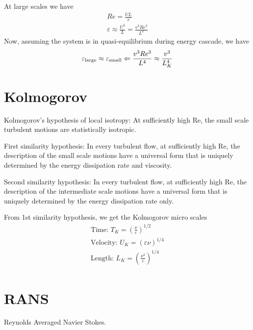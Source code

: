 \documentclass{article}
\let\epsilon\varepsilon
\begin{document}
At large scales we have 
\begin{equation}
	\begin{split}
	Re = \frac{UL}{v}\\
	\epsilon \approx \frac{U^{3}}{L} = \frac{v^{3}Re^{3}}{L^{4}}
	\end{split}
\end{equation}
Now, assuming the system is in quasi-equilibrium during energy cascade, we have
\begin{equation}
	\epsilon_{\text{large}}\approx\epsilon_{\text{small}}\\\Leftarrow
	\frac{v^{3}Re^{3}}{L^{4}}\approx \frac{v^{3}}{L_{K}^{4}}
\end{equation}




\section{Kolmogorov}
Kolmogorov’s hypothesis of local isotropy:
At sufficiently high Re, the small scale turbulent motions are statistically isotropic. 

First similarity hypothesis: 
In every turbulent flow, at sufficiently high Re, the description of the small scale motions have a universal form that is uniquely determined by the energy dissipation rate and viscosity. 

Second similarity hypothesis: 
In every turbulent flow, at sufficiently high Re, the description of the intermediate scale motions have a universal form that is uniquely determined by the energy dissipation rate only.

From 1st similarity hypothesis, we get the Kolmogorov micro scales
\begin{equation}
	\begin{split}
		\text{Time: }T_{K} = \left(\frac{\nu}{\epsilon}\right)^{1/2}\\
		\text{Velocity: }U_{K} = \left(\epsilon\nu\right)^{1/4}\\
		\text{Length: }L_{K} = \left(\frac{\nu^{3}}{\epsilon}\right)^{1/4}\\
	\end{split}
\end{equation}




\section{RANS}
Reynolds Averaged Navier Stokes.
\end{document}

